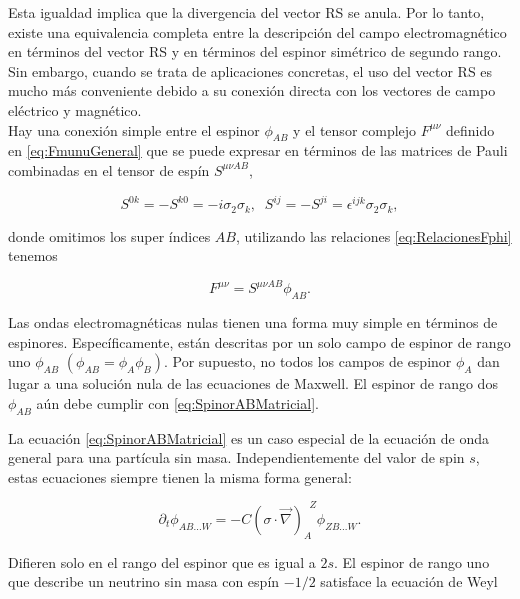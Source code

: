             Esta igualdad implica que la divergencia del vector RS se anula. Por lo tanto, existe una equivalencia completa entre la descripción del campo electromagnético en términos del vector RS y en términos del espinor simétrico de segundo rango. Sin embargo, cuando se trata de aplicaciones concretas, el uso del vector RS es mucho más conveniente debido a su conexión directa con los vectores de campo eléctrico y magnético.\\

            Hay una conexión simple entre el espinor $\phi_{AB}$ y el tensor complejo $F^{\mu\nu}$ definido en \ref{eq:FmunuGeneral} que se puede expresar en términos de las matrices de Pauli combinadas en el tensor de espín $S^{\mu\nu AB}$,

            \begin{equation}
                S^{0k} = - S^{k0} = -i\sigma_2\sigma_k,\;\; S^{ij} = - S^{ji} = \epsilon^{ijk}\sigma_2\sigma_k,
            \end{equation}

            donde omitimos los super índices $AB$, utilizando las relaciones \ref{eq:RelacionesFphi} tenemos

            \begin{equation}
                F^{\mu\nu} = S^{\mu\nu AB}\phi_{AB}.
            \end{equation}

            Las ondas electromagnéticas nulas tienen una forma muy simple en términos de espinores. Específicamente, están descritas por un solo campo de espinor de rango uno $\phi_{AB}$ $(\phi_{AB} = \phi_A\phi_B)$. Por supuesto, no todos los campos de espinor $\phi_A$ dan lugar a una solución nula de las ecuaciones de Maxwell. El espinor de rango dos $\phi_{AB}$ aún debe cumplir con \ref{eq:SpinorABMatricial}.

            La ecuación \ref{eq:SpinorABMatricial} es un caso especial de la ecuación de onda general para una partícula sin masa. Independientemente del valor de spin $s$, estas ecuaciones siempre tienen la misma forma general:

            \begin{equation}
                \partial_t \phi_{AB...W} = -C\left( \sigma \cdot \Vec{\nabla} \right)_A^{\;\;Z}\phi_{ZB...W}.
            \end{equation}

            Difieren solo en el rango del espinor que es igual a $2s$. El espinor de rango uno que describe un neutrino sin masa con espín $-1/2$ satisface la ecuación de Weyl

